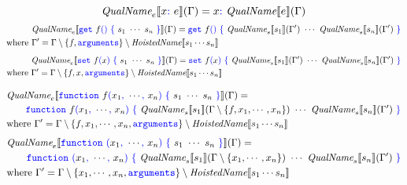 \documentclass[a4paper]{article}
\newcommand{\code}[1]{\textcolor{blue}{\tt #1}}
\newcommand{\Where}{\mbox{where}}
\newcommand{\HoistedName}{\emph{HoistedName}}
\newcommand{\QualName}{\emph{QualName}}
\begin{document}
\begin{equation*}
\QualName_e \llbracket x\code{:}\ e \rrbracket (\Gamma) = x\code{:}\ \QualName \llbracket e \rrbracket (\Gamma)
\end{equation*}
\begin{equation*}
\begin{split}
&\QualName_e \llbracket \code{get}\ f\code{()}\ \code{\{}\ s_1\ \cdots\ s_n\ \code{\}} \rrbracket (\Gamma) = \code{get}\ f\code{()}\ \code{\{}\ \QualName_s \llbracket s_1 \rrbracket (\Gamma')\ \cdots\ \QualName_s \llbracket s_n \rrbracket (\Gamma')\ \code{\}} \\
\Where\ & \Gamma' = \Gamma \setminus \{f, \code{arguments}\} \setminus \HoistedName \llbracket s_1 \cdots s_n \rrbracket
\end{split}
\end{equation*}
\begin{equation*}
\begin{split}
&\QualName_e \llbracket \code{set}\ f\code{(}x\code{)}\ \code{\{}\ s_1\ \cdots\ s_n\ \code{\}} \rrbracket (\Gamma) = \code{set}\ f\code{(}x\code{)}\ \code{\{}\ \QualName_s \llbracket s_1 \rrbracket (\Gamma')\ \cdots\ \QualName_s \llbracket s_n \rrbracket (\Gamma')\ \code{\}} \\
\Where\ & \Gamma' = \Gamma \setminus \{f, x, \code{arguments}\} \setminus \HoistedName \llbracket s_1 \cdots s_n \rrbracket
\end{split}
\end{equation*}

\begin{equation*}
\begin{split}
&\QualName_e \llbracket \code{function}\ f\code{(}x_1\code{,}\ \cdots\code{,}\ x_n\code{)}\ \code{\{}\ s_1\ \cdots\ s_n\ \code{\}} \rrbracket (\Gamma) = \\
&\qquad\code{function}\ f\code{(}x_1\code{,}\ \cdots\code{,}\ x_n\code{)}\ \code{\{}\ \QualName_s \llbracket s_1 \rrbracket (\Gamma \setminus \{f, x_1, \cdots, x_n\})\ \cdots\ \QualName_s \llbracket s_n \rrbracket (\Gamma')\ \code{\}} \\
&\Where\ \Gamma' = \Gamma \setminus \{f, x_1, \cdots, x_n, \code{arguments}\} \setminus \HoistedName \llbracket s_1 \cdots s_n \rrbracket
\end{split}
\end{equation*}
\begin{equation*}
\begin{split}
&\QualName_e \llbracket \code{function}\ \code{(}x_1\code{,}\ \cdots\code{,}\ x_n\code{)}\ \code{\{}\ s_1\ \cdots\ s_n\ \code{\}} \rrbracket (\Gamma) = \\
&\qquad\code{function}\ \code{(}x_1\code{,}\ \cdots\code{,}\ x_n\code{)}\ \code{\{}\ \QualName_s \llbracket s_1 \rrbracket (\Gamma \setminus \{x_1, \cdots, x_n\})\ \cdots\ \QualName_s \llbracket s_n \rrbracket (\Gamma')\ \code{\}} \\
&\Where\ \Gamma' = \Gamma \setminus \{x_1, \cdots, x_n, \code{arguments}\} \setminus \HoistedName \llbracket s_1 \cdots s_n \rrbracket
\end{split}
\end{equation*}
\end{document}
